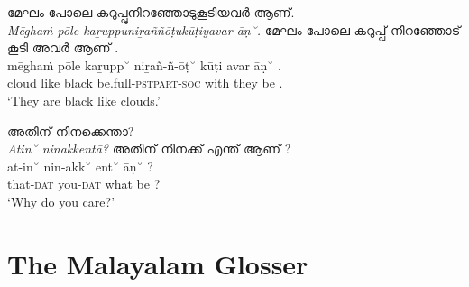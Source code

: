 \documentclass[a4paper]{article}
\newcommand{\afx}[1]{\textsc{#1}}
\begin{document}
\begin{exe}
\ex
മേഘം പോലെ കറുപ്പുനിറഞ്ഞോടുകൂടിയവർ ആണ്. \\
\textit{Mēghaṁ pōle kaṟuppuniṟaññōṭukūṭiyavar āṇ˘.}
\glll
മേഘം പോലെ കറുപ്പ് നിറഞ്ഞോട് കൂടി അവർ ആണ് . \\
mēghaṁ pōle kaṟupp˘ niṟañ-ñ-ōṭ˘ kūṭi avar āṇ˘ . \\
cloud like black be.full-\afx{pstpart}-\afx{soc} with they be . \\
\trans `They are black like clouds.' \parencite[p.~179]{ascaryacudamani}
\end{exe}


\begin{exe}
\ex
അതിന് നിനക്കെന്താ? \\
\textit{Atin˘ ninakkentā?}
\glll
അതിന് നിനക്ക് എന്ത് ആണ് ? \\
at-in˘ nin-akk˘ ent˘ āṇ˘ ? \\
that-\afx{dat} you-\afx{dat} what be ? \\
\trans `Why do you care?' \parencite[p.~165]{moag}
\end{exe}

%
%
%
%

\section{The Malayalam Glosser}
\end{document}

